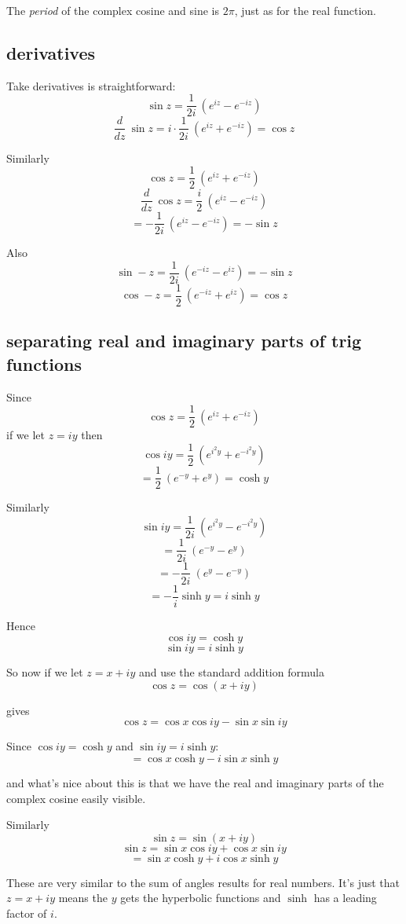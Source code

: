 \documentclass[11pt, oneside]{article}
\begin{document}
The \emph{period} of the complex cosine and sine is $2 \pi$, just as for the real function.

\subsection*{derivatives}

Take derivatives is straightforward:
\[ \sin z = \frac{1}{2i} \ (e^{iz} - e^{-iz}) \]
\[ \frac{d}{dz} \ \sin z = i \cdot \frac{1}{2i} \ (e^{iz} + e^{-iz}) = \cos z \]

Similarly
\[ \cos z = \frac{1}{2} \ (e^{iz} + e^{-iz} ) \]
\[ \frac{d}{dz} \ \cos z = \frac{i}{2} \ ( e^{iz} - e^{-iz} ) \]
\[ =- \frac{1}{2i} \ ( e^{iz} - e^{-iz} ) = -\sin z \]

Also
\[ \sin -z = \frac{1}{2i} \ (e^{-iz} - e^{iz}) = - \sin z \]
\[ \cos -z = \frac{1}{2} \ (e^{-iz} + e^{iz} ) = \cos z \]

\subsection*{separating real and imaginary parts of trig functions}

Since
\[ \cos z =  \frac{1}{2} \ (e^{iz} + e^{-iz}) \]
if we let $z = iy$ then
\[ \cos iy =  \frac{1}{2} \ (e^{i^2y} + e^{-i^2y}) \]
\[ =  \frac{1}{2} \ (e^{-y} + e^{y}) = \cosh y \]

Similarly
\[ \sin iy =   \frac{1}{2i} \ (e^{i^2y} - e^{-i^2y}) \]
\[ =   \frac{1}{2i} \ (e^{-y} - e^{y}) \]
\[ = - \frac{1}{2i} \ (e^y - e^{-y}) \]
\[ = - \frac{1}{i} \sinh y  = i \sinh y \]

Hence 
\[ \cos iy = \cosh y \]
\[ \sin iy =  i \sinh y \]

So now if we let $z = x + iy$ and use the standard addition formula
\[ \cos z = \cos (x + iy) \]

gives
\[ \cos z = \cos x \cos iy - \sin x \sin iy \]

Since $\cos iy = \cosh y$ and $\sin iy = i \sinh y$:
\[ = \cos x \cosh y - i \sin x \sinh y \]

and what's nice about this is that we have the real and imaginary parts of the complex cosine easily visible.  

Similarly
\[ \sin z = \sin(x + iy) \]
\[ \sin z = \sin x \cos iy + \cos x \sin iy \]
\[ = \sin x \cosh y + i \cos x \sinh y \]

These are very similar to the sum of angles results for real numbers.  It's just that $z = x + iy$ means the $y$ gets the hyperbolic functions and $\sinh$ has a leading factor of $i$.
\end{document}
